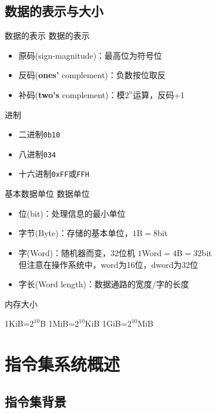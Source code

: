 \documentclass{myslide}
\begin{document}
\subsection{数据的表示与大小}
\begin{frame}
\subsectionpage
\end{frame}

\begin{frame}[fragile]{数据的表示}
数据的表示
\begin{itemize}
	\item 原码(sign-magnitude)：最高位为符号位
	\item 反码(\textbf{ones'} complement)：负数按位取反
	\item 补码(\textbf{two's} complement)：模$2^n$运算，反码+1
\end{itemize}
进制
\begin{itemize}
	\item 二进制\verb'0b10'
	\item 八进制\verb'034'
	\item 十六进制\verb'0xFF'或\verb'FFH'
\end{itemize}
\end{frame}

\begin{frame}{基本数据单位}
数据单位
\begin{itemize}
	\item 位(bit)：处理信息的最小单位
	\item 字节(Byte)：存储的基本单位，$1$B$=8$bit
	\item 字(Word)：随机器而变，32位机 $1$Word$=4$B$=32$bit\\
	但注意在操作系统中，word为16位，dword为32位
	\item 字长(Word length)：数据通路的宽度/字的长度
\end{itemize}
内存大小\\
\begin{center}
1KiB=$2^{10}$B\qquad
1MiB=$2^{10}$KiB\qquad
1GiB=$2^{10}$MiB
\end{center}
\end{frame}

\section{指令集系统概述}
\begin{frame}
\sectionpage
\end{frame}

\subsection{指令集背景}
\begin{frame}
\subsectionpage
\end{frame}
\end{document}
